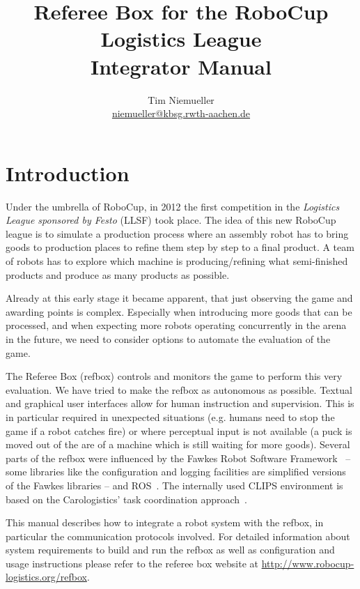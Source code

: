 \documentclass[a4paper]{article}
\begin{document}
\title{\textbf{Referee Box for the RoboCup Logistics League}\\%
  \Large Integrator Manual}
\author{Tim Niemueller\\\href{mailto:niemueller@cs.rwth-aachen.de}{niemueller@kbsg.rwth-aachen.de}}
\maketitle

\section{Introduction}
\label{sec:intro}
Under the umbrella of RoboCup, in 2012 the first competition in the
\textit{Logistics League sponsored by Festo} (LLSF) took place. The
idea of this new RoboCup league is to simulate a production process
where an assembly robot has to bring goods to production places to
refine them step by step to a final product. A team of robots has to
explore which machine is producing/refining what semi-finished
products and produce as many products as possible.

Already at this early stage it became apparent, that just observing
the game and awarding points is complex. Especially when introducing
more goods that can be processed, and when expecting more robots
operating concurrently in the arena in the future, we need to consider
options to automate the evaluation of the game.

The Referee Box (refbox) controls and monitors the game to perform
this very evaluation. We have tried to make the refbox as autonomous
as possible. Textual and graphical user interfaces allow for human
instruction and supervision. This is in particular required in
unexpected situations (e.g. humans need to stop the game if a robot
catches fire) or where perceptual input is not available (a puck is
moved out of the are of a machine which is still waiting for more
goods). Several parts of the refbox were influenced by the Fawkes
Robot Software Framework~\cite{Fawkes} -- some libraries like the
configuration and logging facilities are simplified versions of the
Fawkes libraries -- and ROS~\cite{ROS}. The internally used CLIPS
environment is based on the Carologistics' task coordination
approach~\cite{CLIPS-Agent}.

This manual describes how to integrate a robot system with the refbox,
in particular the communication protocols involved. For detailed
information about system requirements to build and run the refbox as
well as configuration and usage instructions please refer to the
referee box website at \url{http://www.robocup-logistics.org/refbox}.
\end{document}
